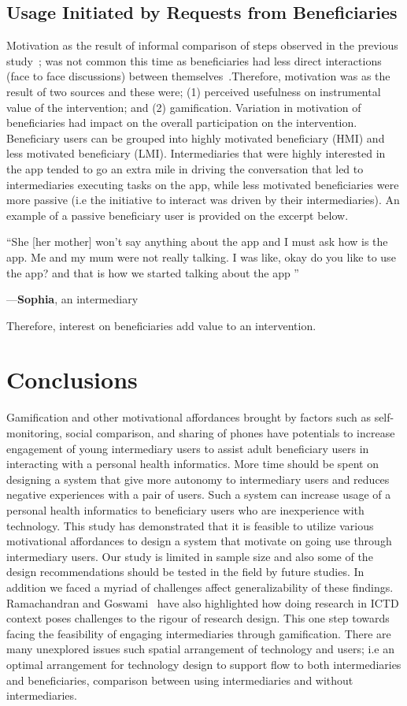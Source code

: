 \documentclass{sig-alternate}
\newenvironment{myquote}
               {\list{}{\rightmargin   \leftmargin
                        \parsep        0in }%
                \item\relax}
               {\endlist}
\newcommand{\userquote}[2]{\begin{samepage}\begin{myquote} 
     \em{\small{#2\begin{flushright}---#1\end{flushright}}}
   \end{myquote}\end{samepage}}
\begin{document}
\subsection*{\textbf{Usage Initiated by Requests from Beneficiaries}}
Motivation as the result of informal comparison of steps observed in the previous study~\cite{}; was not common this time as beneficiaries had less direct interactions (face to face discussions) between themselves~\cite{katule2016:leveraging}.Therefore, motivation was as the result of two sources and these were; (1) perceived usefulness on instrumental value of the intervention; and (2) gamification. Variation in  motivation of beneficiaries had impact on the overall participation on the intervention. Beneficiary users can be grouped into highly motivated beneficiary (HMI) and less motivated beneficiary (LMI). Intermediaries that were highly interested in the app tended to go an extra mile in driving the conversation that led to intermediaries executing tasks on the app, while less motivated beneficiaries were more passive (i.e the initiative to interact was driven by their intermediaries). An example of a passive beneficiary user is provided on the excerpt below.

\userquote{\textbf{Sophia}, an intermediary} {``She [her mother] won't say anything about the app and I must ask how is the app. Me and my mum were not really talking. I was like, okay do you like to use the app? and that is how we started talking about the app ''} 

Therefore, interest on beneficiaries add value to an intervention.
\section{Conclusions}
Gamification and other motivational affordances brought by factors such as self-monitoring, social comparison, and sharing of phones have potentials to increase engagement of young intermediary users to assist adult beneficiary users in interacting with a personal health informatics. More time should be spent on designing a system that give more autonomy to intermediary users and reduces negative experiences with a pair of users. Such a system can increase usage of a personal health informatics to beneficiary users who are inexperience with technology. This study has demonstrated that it is feasible to utilize various motivational affordances to design a system that motivate on going use through intermediary users. Our study is limited in sample size and also some of the design recommendations should be tested in the field by future studies. In addition we faced a myriad of challenges affect generalizability of these findings. Ramachandran and Goswami~\cite{ramachandran2010research} have also highlighted how doing research in ICTD context poses challenges to the rigour of research design. This one step towards facing the feasibility of engaging intermediaries through gamification. There are many unexplored issues such spatial arrangement of technology and users; i.e an optimal arrangement for technology design to support flow to both intermediaries and beneficiaries, comparison between using intermediaries and without intermediaries.
\end{document}
